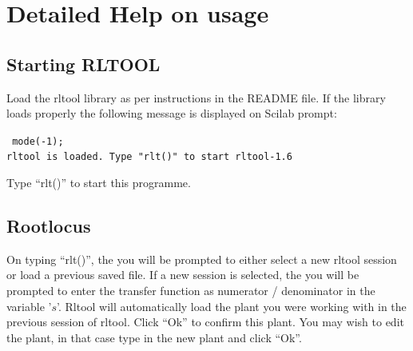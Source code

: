 \chapter{Detailed Help on usage}
\section{Starting RLTOOL}
Load the rltool library as per instructions in the README file. If the
library loads properly the following message is displayed on Scilab prompt: 

\begin{center}
{\tt
mode(-1); \\
rltool is loaded. Type "rlt()" to start rltool-1.6\\              
}
\end{center}
Type ``rlt()'' to start this programme. 
\section{Rootlocus}
\label{rootlocus}
On typing ``rlt()'', the you will be  prompted to either select a new
rltool session or load a previous saved file. If a new session is
selected, the you will be  prompted to enter the transfer
function as numerator / denominator in the variable '$s$'. Rltool will
automatically load the plant you were working with in the previous
session of rltool. Click ``Ok'' to confirm this plant. You may wish to
edit the plant, in that case type in the new plant and click ``Ok''. 

